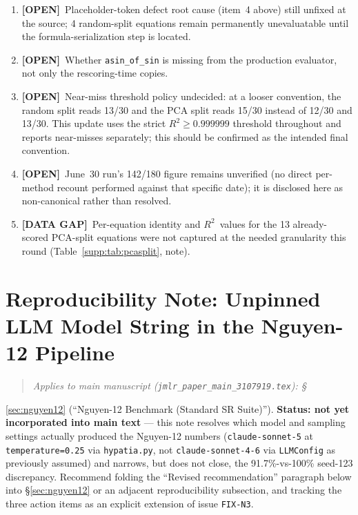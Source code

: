 \documentclass[11pt]{article}
\newcommand{\rtwo}{$R^2$}
\newcommand{\open}{\textcolor{red!60!black}{\textbf{[OPEN]}}}
\newcommand{\gap}{\textcolor{purple!60!black}{\textbf{[DATA GAP]}}}
\newenvironment{appliesto}[1]
  {\begin{quote}\small\itshape\noindent Applies to main manuscript
    (\texttt{jmlr\_paper\_main\_3107919.tex}): #1\end{quote}}
  {}
\begin{document}
\begin{enumerate}
\item \open\ Placeholder-token defect root cause (item~4 above) still
unfixed at the source; 4 random-split equations remain permanently
unevaluatable until the formula-serialization step is located.
\item \open\ Whether \texttt{asin\_of\_sin} is missing from the
production evaluator, not only the rescoring-time copies.
\item \open\ Near-miss threshold policy undecided: at a looser
convention, the random split reads 13/30 and the PCA split reads 15/30
instead of 12/30 and 13/30. This update uses the strict
$R^2\geq0.999999$ threshold throughout and reports near-misses
separately; this should be confirmed as the intended final convention.
\item \open\ June~30 run's 142/180 figure remains unverified (no direct
per-method recount performed against that specific date); it is
disclosed here as non-canonical rather than resolved.
\item \gap\ Per-equation identity and \rtwo\ values for the 13
already-scored PCA-split equations were not captured at the needed
granularity this round (Table~\ref{supp:tab:pcasplit}, note).
\end{enumerate}

\clearpage
\section{Reproducibility Note: Unpinned LLM Model String in the Nguyen-12 Pipeline}
\label{supp:nguyen12}

\begin{appliesto}
\S\ref{sec:nguyen12} (``Nguyen-12 Benchmark (Standard SR Suite)'').
\textbf{Status: not yet incorporated into main text} --- this note
resolves which model and sampling settings actually produced the
Nguyen-12 numbers (\texttt{claude-sonnet-5} at \texttt{temperature=0.25}
via \texttt{hypatia.py}, not \texttt{claude-sonnet-4-6} via
\texttt{LLMConfig} as previously assumed) and narrows, but does not
close, the 91.7\%-vs-100\% seed-123 discrepancy. Recommend folding the
``Revised recommendation'' paragraph below into
\S\ref{sec:nguyen12} or an adjacent reproducibility subsection, and
tracking the three action items as an explicit extension of issue
\texttt{FIX-N3}.
\end{appliesto}
\end{document}
